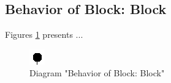 \subsection{Behavior of Block: Block}
Figures \ref{fig:BlockBlock21} presents ...
\begin{figure}[htb]
\centering
\includegraphics[width=\textwidth]{img_2_1.png}
\caption{Diagram "Behavior of Block: Block"}
\label{fig:BlockBlock21}
\end{figure}

